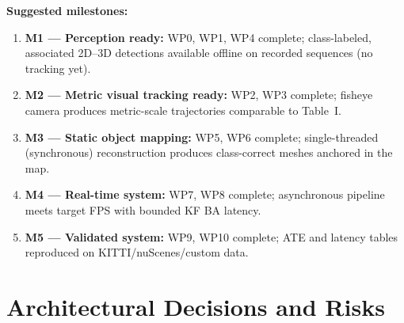 \documentclass[11pt]{article}
\begin{document}
\noindent\textbf{Suggested milestones:}
\begin{enumerate}[nosep]
  \item \textbf{M1 --- Perception ready:} WP0, WP1, WP4 complete; class-labeled, associated 2D--3D detections available offline on recorded sequences (no tracking yet).
  \item \textbf{M2 --- Metric visual tracking ready:} WP2, WP3 complete; fisheye camera produces metric-scale trajectories comparable to Table~I.
  \item \textbf{M3 --- Static object mapping:} WP5, WP6 complete; single-threaded (synchronous) reconstruction produces class-correct meshes anchored in the map.
  \item \textbf{M4 --- Real-time system:} WP7, WP8 complete; asynchronous pipeline meets target FPS with bounded KF BA latency.
  \item \textbf{M5 --- Validated system:} WP9, WP10 complete; ATE and latency tables reproduced on KITTI/nuScenes/custom data.
\end{enumerate}

\section{Architectural Decisions and Risks}
\label{sec:risks}
\end{document}
